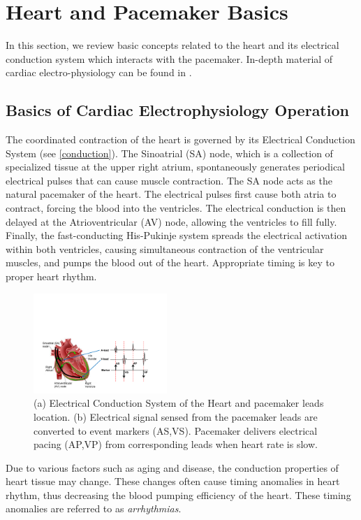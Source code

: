 \section{Heart and Pacemaker Basics}
\label{basics}
In this section, we review basic concepts related to the heart and its electrical conduction system which interacts with the pacemaker. 
In-depth material of cardiac electro-physiology can be found in \cite{fogoros}. 

\subsection{Basics of Cardiac Electrophysiology Operation}
The coordinated contraction of the heart is governed by its Electrical Conduction System (see \ref{conduction}). The Sinoatrial (SA) node, which is a collection of specialized tissue at the upper right atrium, spontaneously generates periodical electrical pulses that can cause muscle contraction. 
The SA node acts as the natural pacemaker of the heart. 
The electrical pulses first cause both atria to contract, forcing the blood into the ventricles. 
The electrical conduction is then delayed at the Atrioventricular (AV) node, allowing the ventricles to fill fully. Finally, the fast-conducting His-Pukinje system spreads the electrical activation within both ventricles, causing simultaneous contraction of the ventricular muscles, and pumps the blood out of the heart. 
Appropriate timing is key to proper heart rhythm.

\begin{figure}
  	\begin{center}
    	\includegraphics[width=0.45\textwidth]{figures/egm.pdf}
  	\end{center}
	\caption{\small (a) Electrical Conduction System of the Heart and pacemaker leads location. (b) Electrical signal sensed from the pacemaker leads are converted to event markers (AS,VS). Pacemaker delivers electrical pacing (AP,VP) from corresponding leads when heart rate is slow.}
	\label{fig:conduction}
\end{figure}

Due to various factors such as aging and disease, the conduction properties of heart tissue may change. 
These changes often cause timing anomalies in heart rhythm, thus decreasing the blood pumping efficiency of the heart. These timing anomalies are referred to as \emph{arrhythmias}.  

%